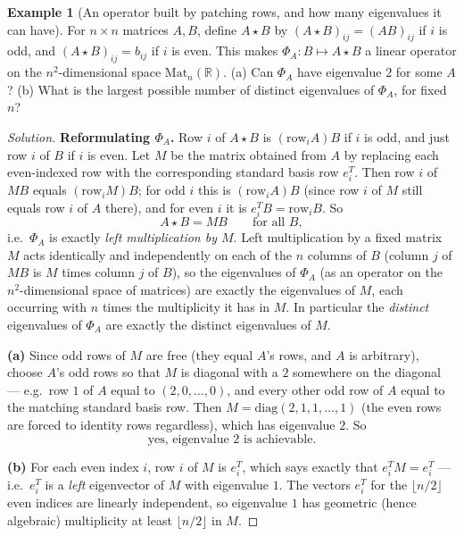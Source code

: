 \documentclass[11pt]{article}
\theoremstyle{definition}
\newtheorem{example}{Example}[section]
\newcommand{\R}{\mathbb{R}}
\begin{document}
\begin{example}[An operator built by patching rows, and how many eigenvalues it can have]
For $n\times n$ matrices $A,B$, define $A\star B$ by $(A\star B)_{ij}=(AB)_{ij}$ if $i$ is odd, and $(A\star B)_{ij}=b_{ij}$ if $i$ is even. This makes $\Phi_A:B\mapsto A\star B$ a linear operator on the $n^2$-dimensional space $\mathrm{Mat}_n(\R)$. (a) Can $\Phi_A$ have eigenvalue $2$ for some $A$? (b) What is the largest possible number of distinct eigenvalues of $\Phi_A$, for fixed $n$?
\end{example}

\begin{proof}[Solution]
\textbf{Reformulating $\Phi_A$.} Row $i$ of $A\star B$ is $(\text{row}_i A)B$ if $i$ is odd, and just row $i$ of $B$ if $i$ is even. Let $M$ be the matrix obtained from $A$ by replacing each even-indexed row with the corresponding standard basis row $e_i^T$. Then row $i$ of $MB$ equals $(\text{row}_iM)B$; for odd $i$ this is $(\text{row}_iA)B$ (since row $i$ of $M$ still equals row $i$ of $A$ there), and for even $i$ it is $e_i^TB=\text{row}_i B$. So
\[
A\star B = MB \qquad \text{for all } B,
\]
i.e.\ $\Phi_A$ is exactly \emph{left multiplication by $M$}. Left multiplication by a fixed matrix $M$ acts identically and independently on each of the $n$ columns of $B$ (column $j$ of $MB$ is $M$ times column $j$ of $B$), so the eigenvalues of $\Phi_A$ (as an operator on the $n^2$-dimensional space of matrices) are exactly the eigenvalues of $M$, each occurring with $n$ times the multiplicity it has in $M$. In particular the \emph{distinct} eigenvalues of $\Phi_A$ are exactly the distinct eigenvalues of $M$.

\textbf{(a)} Since odd rows of $M$ are free (they equal $A$'s rows, and $A$ is arbitrary), choose $A$'s odd rows so that $M$ is diagonal with a $2$ somewhere on the diagonal — e.g.\ row $1$ of $A$ equal to $(2,0,\dots,0)$, and every other odd row of $A$ equal to the matching standard basis row. Then $M=\mathrm{diag}(2,1,1,\dots,1)$ (the even rows are forced to identity rows regardless), which has eigenvalue $2$. So
\[
\boxed{\text{yes, eigenvalue } 2 \text{ is achievable}}.
\]

\textbf{(b)} For each even index $i$, row $i$ of $M$ is $e_i^T$, which says exactly that $e_i^T M = e_i^T$ — i.e.\ $e_i^T$ is a \emph{left} eigenvector of $M$ with eigenvalue $1$. The vectors $e_i^T$ for the $\lfloor n/2\rfloor$ even indices are linearly independent, so eigenvalue $1$ has geometric (hence algebraic) multiplicity at least $\lfloor n/2\rfloor$ in $M$.


\end{proof}
\end{document}
